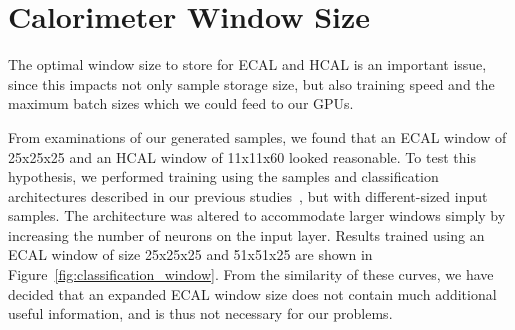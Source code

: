 \section{Calorimeter Window Size}\label{calo_rec_window_size}

The optimal window size to store for ECAL and HCAL is an important issue, since this impacts not only sample storage size, but also training speed and the maximum batch sizes which we could feed to our GPUs. 

From examinations of our generated samples, we found that an ECAL window of 25x25x25 and an HCAL window of 11x11x60 looked reasonable. To test this hypothesis, we performed training using the samples and classification architectures described in our previous studies~\cite{NIPS}, but with different-sized input samples. The architecture was altered to accommodate larger windows simply by increasing the number of neurons on the input layer. Results trained using an ECAL window of size 25x25x25 and 51x51x25 are shown in Figure~\ref{fig:classification_window}. From the similarity of these curves, we have decided that an expanded ECAL window size does not contain much additional useful information, and is thus not necessary for our problems.

